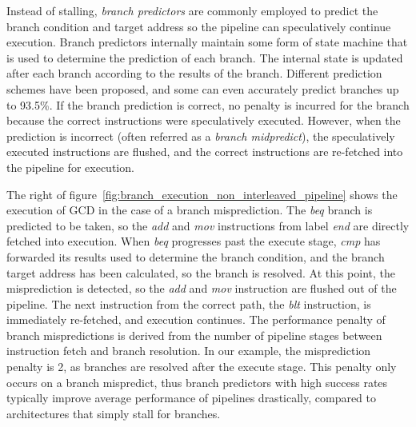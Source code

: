 Instead of stalling, \emph{branch predictors} are commonly employed to predict the branch condition and target address so the pipeline can speculatively continue execution. 
Branch predictors internally maintain some form of state machine that is used to determine the prediction of each branch.  
The internal state is updated after each branch according to the results of the branch. 
Different prediction schemes have been proposed, and some can even accurately predict branches up to 93.5\%.  
If the branch prediction is correct, no penalty is incurred for the branch because the correct instructions were speculatively executed.  
However, when the prediction is incorrect (often referred as a \emph{branch midpredict}), the speculatively executed instructions are flushed, and the correct instructions are re-fetched into the pipeline for execution.

The right of figure~\ref{fig:branch_execution_non_interleaved_pipeline} shows the execution of GCD in the case of a branch misprediction.
The \emph{beq} branch is predicted to be taken, so the \emph{add} and \emph{mov} instructions from label \emph{end} are directly fetched into execution. 
When \emph{beq} progresses past the execute stage, \emph{cmp} has forwarded its results used to determine the branch condition, and the branch target address has been calculated, so the branch is resolved.
At this point, the misprediction is detected, so the \emph{add} and \emph{mov} instruction are flushed out of the pipeline. 
The next instruction from the correct path, the \emph{blt} instruction, is immediately re-fetched, and execution continues.
The performance penalty of branch mispredictions is derived from the number of pipeline stages between instruction fetch and branch resolution.  
In our example, the misprediction penalty is 2, as branches are resolved after the execute stage.
This penalty only occurs on a branch mispredict, thus branch predictors with high success rates typically improve average performance of pipelines drastically, compared to architectures that simply stall for branches.

